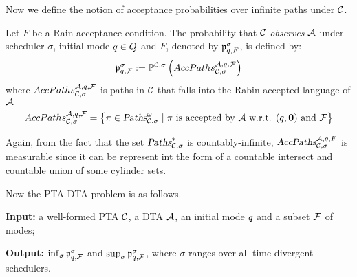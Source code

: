 Now we define the notion of acceptance probabilities over infinite paths under $\mathcal{C}$.
\vspace{-0.8em}
\begin{definition}
Let $F$ be a Rain acceptance condition.
The probability that $\mathcal{C}$ \emph{observes} $\mathcal{A}$ under scheduler $\sigma$, initial mode $q\in Q$ and $F$, denoted by $\mathfrak{p}_{q,F}^{\sigma}$, is defined by:
\[
    \mathfrak{p}_{q,\mathcal{F}}^{\sigma}
        :=
            \mathbb{P}^{\mathcal{C},\sigma}\left(
                AccPaths _{\mathcal{C},\sigma} ^{\mathcal{A},q,\mathcal{F}}
            \right)
\]
where $AccPaths _{\mathcal{C},\sigma} ^{\mathcal{A},q,\mathcal{F}}$ is paths in $\mathcal{C}$ that falls into the Rabin-accepted language of $\mathcal{A}$
$$
    AccPaths _{\mathcal{C},\sigma} ^{\mathcal{A},q,\mathcal{F}} = \left \{ 
        \pi \in \mbox{\sl Paths}^\omega_{\mathcal{C},\sigma} \mid 
        \pi
        \mbox{ is accepted by } \mathcal{A} \mbox{ w.r.t. } (q,\mathbf{0}) \mbox{ and } \mathcal{F} 
    \right\}
$$
\end{definition}
Again, from the fact that the set $\mbox{\sl Paths}^*_{\mathcal{C},\sigma}$ is countably-infinite, 
${\mbox{\sl AccPaths}}_{\mathcal{C},\sigma}^{\mathcal{A},q,F}$ is \textcolor[rgb]{1,0,0}{measurable since it can be represent int the 
form of a countable intersect and countable union of some cylinder sets}.

Now the {\sc PTA-DTA} problem is as follows.

\begin{compactitem}
\item {\bf Input:} a well-formed PTA $\mathcal{C}$, a DTA $\mathcal{A}$, an initial mode $q$ and a subset $\mathcal{F}$ of modes;
\item {\bf Output:} $\inf_\sigma \mathfrak{p}_{q,\mathcal{F}}^{\sigma}$ and $\sup_\sigma  \mathfrak{p}_{q,\mathcal{F}}^{\sigma}$, where $\sigma$ ranges over all time-divergent schedulers.
\end{compactitem}



